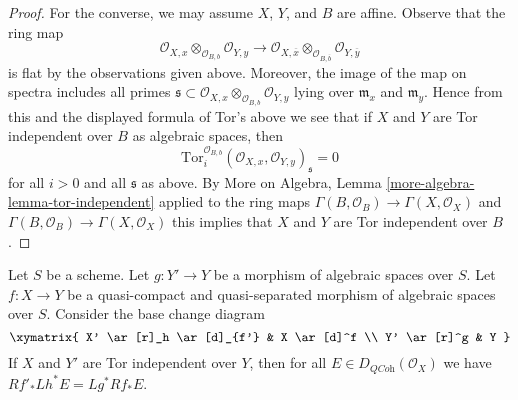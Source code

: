 \begin{proof}
\medskip\noindent
For the converse, we may assume $X$, $Y$, and $B$ are affine.
Observe that the ring map
$$
\mathcal{O}_{X, x} \otimes_{\mathcal{O}_{B, b}} \mathcal{O}_{Y, y}
\longrightarrow
\mathcal{O}_{X, \overline{x}} \otimes_{\mathcal{O}_{B, \overline{b}}}
\mathcal{O}_{Y, \overline y}
$$
is flat by the observations given above. Moreover, the image of the map
on spectra includes all primes
$\mathfrak s \subset
\mathcal{O}_{X, x} \otimes_{\mathcal{O}_{B, b}} \mathcal{O}_{Y, y}$
lying over $\mathfrak m_x$ and $\mathfrak m_y$.
Hence from this and the displayed formula of Tor's above we see that if
$X$ and $Y$ are Tor independent over $B$ as algebraic spaces, then
$$
\text{Tor}_i^{\mathcal{O}_{B, b}}
(\mathcal{O}_{X, x}, \mathcal{O}_{Y, y})_\mathfrak s = 0
$$
for all $i > 0$ and all $\mathfrak s$ as above. By
More on Algebra, Lemma \ref{more-algebra-lemma-tor-independent}
applied to the ring maps
$\Gamma(B, \mathcal{O}_B) \to \Gamma(X, \mathcal{O}_X)$
and
$\Gamma(B, \mathcal{O}_B) \to \Gamma(X, \mathcal{O}_X)$
this implies that $X$ and $Y$ are Tor independent over $B$.
\end{proof}

\begin{lemma}
\label{lemma-compare-base-change}
Let $S$ be a scheme. Let $g : Y' \to Y$ be a morphism of algebraic spaces over
$S$. Let $f : X \to Y$ be a quasi-compact and quasi-separated morphism of
algebraic spaces over $S$. Consider the base change diagram
$$
\xymatrix{
X' \ar[r]_h \ar[d]_{f'} &
X \ar[d]^f \\
Y' \ar[r]^g &
Y
}
$$
If $X$ and $Y'$ are Tor independent over $Y$, then for all
$E \in D_{\textit{QCoh}}(\mathcal{O}_X)$ we have
$Rf'_*Lh^*E = Lg^*Rf_*E$.
\end{lemma}

